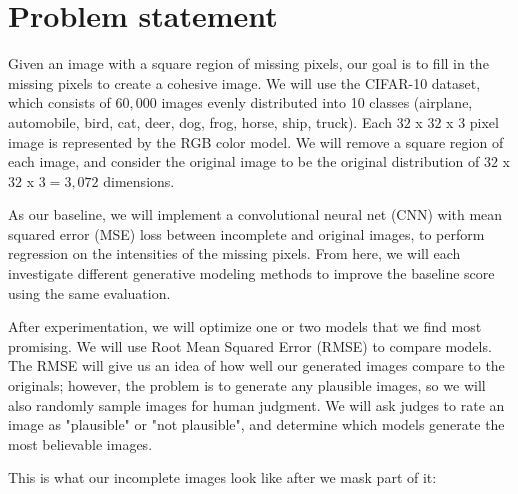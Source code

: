 \documentclass[10pt,twocolumn,letterpaper]{article}
\begin{document}
\section{Problem statement}
Given an image with a square region of missing pixels, our goal is to fill in the missing pixels to create a cohesive image. We will use the CIFAR-10 dataset, which consists of $60,000$ images evenly distributed into 10 classes (airplane, automobile, bird, cat, deer, dog, frog, horse, ship, truck). Each $32$ x $32$ x $3$ pixel image is represented by the RGB color model. We will remove a square region of each image, and consider the original image to be the original distribution of $32$ x $32$ x $3 = 3,072$ dimensions. 

\par As our baseline, we will implement a convolutional neural net (CNN) with mean squared error (MSE) loss between incomplete and original images, to perform regression on the intensities of the missing pixels. From here, we will each investigate different generative modeling methods to improve the baseline score using the same evaluation.

\par After experimentation, we will optimize one or two models that we find most promising. We will use Root Mean Squared Error (RMSE) to compare models. The RMSE will give us an idea of how well our generated images compare to the originals; however, the problem is to generate any plausible images, so we will also randomly sample images for human judgment. We will ask judges to rate an image as "plausible" or "not plausible", and determine which models generate the most believable images. 

This is what our incomplete images look like after we mask part of it:
\end{document}

